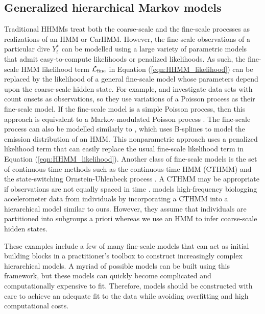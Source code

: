 \subsection{Generalized hierarchical Markov models}

Traditional HHMMs treat both the coarse-scale and the fine-scale processes as realizations of an HMM or CarHMM. 
However, the fine-scale observations of a particular dive $Y^*_t$ can be modelled using a large variety of parametric models that admit easy-to-compute likelihoods or penalized likelihoods. As such, the fine-scale HMM likelihood term $\mathcal{L}_{\text{fine}}$ in Equation (\ref{eqn:HHMM_likelihood}) can be replaced by the likelihood of a general fine-scale model whose parameters depend upon the coarse-scale hidden state.
%
For example, \citet{Bebbington:2007} and \citet{Borchers:2013} investigate data sets with count onsets as observations, so they use variations of a Poisson process as their fine-scale model. If the fine-scale model is a simple Poisson process, then this approach is equivalent to a Markov-modulated Poisson process \citep{Fischer:1993}.
The fine-scale process can also be modelled similarly to \citet{Langrock:2018}, which uses B-splines to model the emission distribution of an HMM. This nonparametric approach uses a penalized likelihood term that can easily replace the usual fine-scale likelihood term in Equation (\ref{eqn:HHMM_likelihood}). 
Another class of fine-scale models is the set of continuous time methods such as the continuous-time HMM (CTHMM) \citep{Liu:2015} and the state-switching Ornstein-Uhlenbeck process \citep{Michelot:2019}. 
A  CTHMM may be appropriate if observations are not equally spaced in time \citep{Liu:2015}. \citet{Xu:2018} models high-frequency biologging accelerometer data from individuals by incorporating a CTHMM into a hierarchical model similar to ours. However, they assume that individuals are partitioned into subgroups a priori whereas we use an HMM to infer coarse-scale hidden states.

These examples include a few of many fine-scale models that can act as initial building blocks in a practitioner's toolbox to construct increasingly complex hierarchical models. 
A myriad of possible models can be built using this framework, but these models can quickly become complicated and computationally expensive to fit. Therefore, models should be constructed with care to achieve an adequate fit to the data while avoiding overfitting and high computational costs.